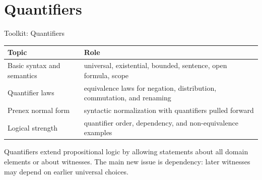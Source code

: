 
\section{Quantifiers}

\begin{toolkitbox}{Toolkit: Quantifiers}
\small
\begin{tabular}{l l}
\toprule
\textbf{Topic} & \textbf{Role} \\
\midrule
Basic syntax and semantics & universal, existential, bounded, sentence, open formula, scope \\
Quantifier laws & equivalence laws for negation, distribution, commutation, and renaming \\
Prenex normal form & syntactic normalization with quantifiers pulled forward \\
Logical strength & quantifier order, dependency, and non-equivalence examples \\
\bottomrule
\end{tabular}
\end{toolkitbox}

\begin{remark*}[Exposition]
Quantifiers extend propositional logic by allowing statements about all domain
elements or about witnesses. The main new issue is dependency: later witnesses
may depend on earlier universal choices.
\end{remark*}





